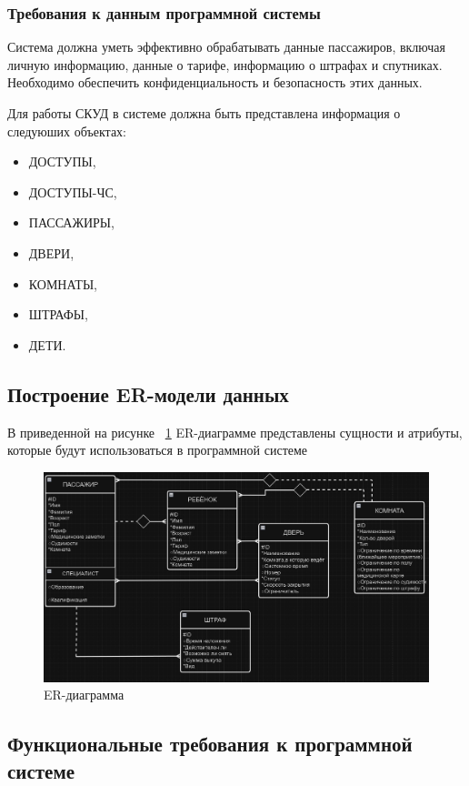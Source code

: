 \subsubsection{Требования к данным программной системы}

Система должна уметь эффективно обрабатывать данные пассажиров, включая личную информацию, данные о тарифе, информацию о штрафах и спутниках. Необходимо обеспечить конфиденциальность и безопасность этих данных.

Для работы СКУД в системе должна быть представлена информация о следуюших объектах:

\begin{itemize}
	\item ДОСТУПЫ,
	\item ДОСТУПЫ-ЧС,
	\item ПАССАЖИРЫ,
	\item ДВЕРИ,
	\item КОМНАТЫ,
	\item ШТРАФЫ,
	\item ДЕТИ.
\end{itemize}


\subsection{Построение ER-модели данных}

В приведенной на рисунке ~\ref{fig:er} ER-диаграмме представлены сущности и атрибуты, которые будут использоваться в программной системе 

\begin{figure}[ht]
	\centering
	\includegraphics[width=1\linewidth]{images/ER}
	\caption{ER-диаграмма}
	\label{fig:er}
\end{figure}

\subsection{Функциональные требования к программной системе}

